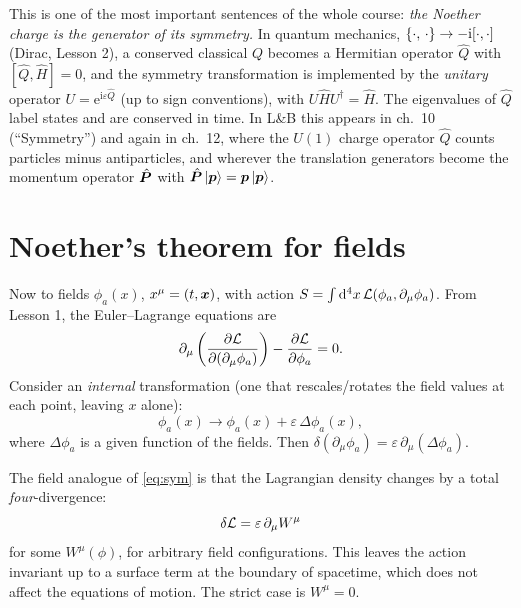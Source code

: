 \documentclass[11pt]{article}
\newcommand{\eps}{\varepsilon}
\begin{document}
\begin{qftbridge}
This is one of the most important sentences of the whole course: \emph{the Noether charge is the generator of its symmetry.} In quantum mechanics, $\left\{\cdot,\,\cdot\right\}\to-\mathrm i[\cdot,\cdot]$ (Dirac, Lesson 2), a conserved classical $Q$ becomes a Hermitian operator $\hat Q$ with $[\hat Q,\hat H]=0$, and the symmetry transformation is implemented by the \emph{unitary} operator $U=\mathrm e^{\mathrm i\eps\hat Q}$ (up to sign conventions), with $U\hat HU^\dagger=\hat H$. The eigenvalues of $\hat Q$ label states and are conserved in time. In L\&B this appears in ch.~10 (``Symmetry'') and again in ch.~12, where the $U(1)$ charge operator $\hat Q$ counts particles minus antiparticles, and wherever the translation generators become the momentum operator $\hat{\bm{P}}$ with $\hat{\bm{P}}\,|\bm{p}\rangle=\bm{p}\,|\bm{p}\rangle$.
\end{qftbridge}

\section{Noether's theorem for fields}

Now to fields $\phi_a(x)$, $x^\mu=(t,\bm{x})$, with action $S=\int\mathrm{d}^4x\,\mathcal{L}(\phi_a,\partial_\mu\phi_a)$. From Lesson 1, the Euler--Lagrange equations are
\begin{equation}
  \partial_\mu\left(\frac{\partial \mathcal{L}}{\partial (\partial_\mu\phi_a)}\right)-\frac{\partial \mathcal{L}}{\partial \phi_a}=0 .
  \label{eq:EL-field}
\end{equation}
Consider an \emph{internal} transformation (one that rescales/rotates the field values at each point, leaving $x$ alone):
\begin{equation}
  \phi_a(x)\to\phi_a(x)+\eps\,\Delta\phi_a(x),
\end{equation}
where $\Delta\phi_a$ is a given function of the fields. Then $\delta(\partial_\mu\phi_a)=\eps\,\partial_\mu(\Delta\phi_a)$.

The field analogue of \eqref{eq:sym} is that the Lagrangian density changes by a total \emph{four}-divergence:
\begin{equation}
  \delta\Lag=\eps\,\partial_\mu W^\mu
  \label{eq:sym-field}
\end{equation}
for some $W^\mu(\phi)$, for arbitrary field configurations. This leaves the action invariant up to a surface term at the boundary of spacetime, which does not affect the equations of motion. The strict case is $W^\mu=0$.
\end{document}
